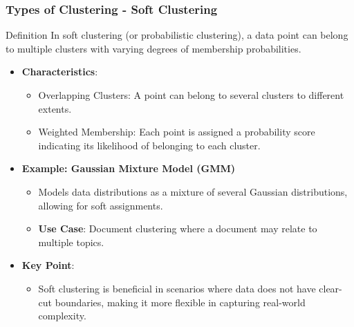 \documentclass[aspectratio=169]{beamer}
\begin{document}
\begin{frame}[fragile]
    \frametitle{Types of Clustering - Soft Clustering}
    \begin{block}{Definition}
        In soft clustering (or probabilistic clustering), a data point can belong to multiple clusters with varying degrees of membership probabilities.
    \end{block}

    \begin{itemize}
        \item \textbf{Characteristics}:
        \begin{itemize}
            \item Overlapping Clusters: A point can belong to several clusters to different extents.
            \item Weighted Membership: Each point is assigned a probability score indicating its likelihood of belonging to each cluster.
        \end{itemize}

        \item \textbf{Example: Gaussian Mixture Model (GMM)}
        \begin{itemize}
            \item Models data distributions as a mixture of several Gaussian distributions, allowing for soft assignments.
            \item \textbf{Use Case}: Document clustering where a document may relate to multiple topics.
        \end{itemize}
        
        \item \textbf{Key Point}: 
        \begin{itemize}
            \item Soft clustering is beneficial in scenarios where data does not have clear-cut boundaries, making it more flexible in capturing real-world complexity.
        \end{itemize}
    \end{itemize}
\end{frame}
\end{document}
